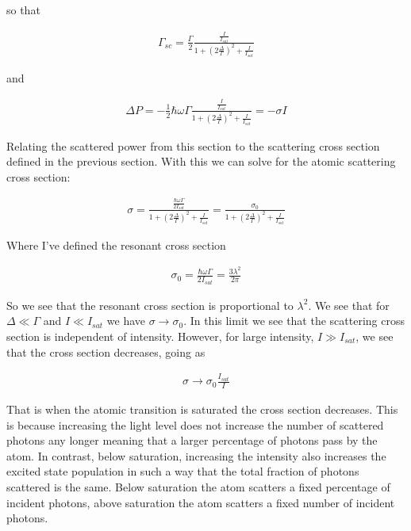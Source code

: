 \documentclass[12pt]{article}
\begin{document}
so that

\begin{align}
\Gamma_{sc} = \frac{\Gamma}{2} \frac{\frac{I}{I_{sat}}}{1 + \left(2\frac{\Delta}{\Gamma}\right)^2 + \frac{I}{I_{sat}}}
\end{align}

and

\begin{align}
\Delta P = -\frac{1}{2}\hbar \omega \Gamma \frac{\frac{I}{I_{sat}}}{1 + \left(2\frac{\Delta}{\Gamma}\right)^2 + \frac{I}{I_{sat}}} = - \sigma I
\end{align}

Relating the scattered power from this section to the scattering cross section defined in the previous section.
With this we can solve for the atomic scattering cross section:

\begin{align}
\sigma = \frac{\frac{\hbar \omega \Gamma}{2I_{sat}}}{1+\left(2\frac{\Delta}{\Gamma}\right)^2 + \frac{I}{I_{sat}}} = \frac{\sigma_0}{1 + \left(2\frac{\Delta}{\Gamma}\right)^2 + \frac{I}{I_{sat}}}
\end{align}

Where I've defined the resonant cross section

\begin{align}
\sigma_0 = \frac{\hbar \omega \Gamma}{2I_{sat}} = \frac{3\lambda^2}{2\pi}
\end{align}

So we see that the resonant cross section is proportional to $\lambda^2$.
We see that for $\Delta \ll \Gamma$ and $I\ll I_{sat}$ we have $\sigma \rightarrow \sigma_0$.
In this limit we see that the scattering cross section is independent of intensity.
However, for large intensity, $I\gg I_{sat}$, we see that the cross section decreases, going as

\begin{align}
\sigma \rightarrow \sigma_0 \frac{I_{sat}}{I}
\end{align}

That is when the atomic transition is saturated the cross section decreases.
This is because increasing the light level does not increase the number of scattered photons any longer meaning that a larger percentage of photons pass by the atom.
In contrast, below saturation, increasing the intensity also increases the excited state population in such a way that the total fraction of photons scattered is the same.
Below saturation the atom scatters a fixed percentage of incident photons, above saturation the atom scatters a fixed number of incident photons.
\end{document}
